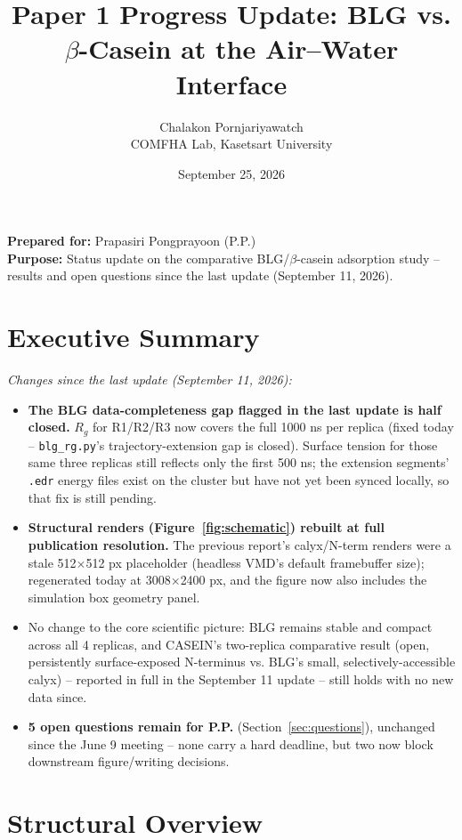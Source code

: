 \documentclass[11pt]{article}
\title{Paper 1 Progress Update: BLG vs. $\beta$-Casein at the Air--Water Interface}
\author{Chalakon Pornjariyawatch \\ COMFHA Lab, Kasetsart University}
\date{September 25, 2026}
\begin{document}
\maketitle

\noindent\textbf{Prepared for:} Prapasiri Pongprayoon (P.P.) \\
\textbf{Purpose:} Status update on the comparative BLG/$\beta$-casein adsorption study --
results and open questions since the last update (September 11, 2026).

\section*{Executive Summary}
\noindent\textit{Changes since the last update (September 11, 2026):}
\begin{itemize}[itemsep=2pt]
  \item \textbf{The BLG data-completeness gap flagged in the last update is half closed.}
    $R_g$ for R1/R2/R3 now covers the full 1000 ns per replica (fixed today --
    \texttt{blg\_rg.py}'s trajectory-extension gap is closed). Surface tension for those
    same three replicas still reflects only the first 500 ns; the extension segments'
    \texttt{.edr} energy files exist on the cluster but have not yet been synced locally,
    so that fix is still pending.
  \item \textbf{Structural renders (Figure~\ref{fig:schematic}) rebuilt at full
    publication resolution.} The previous report's calyx/N-term renders were a stale
    512$\times$512 px placeholder (headless VMD's default framebuffer size); regenerated
    today at 3008$\times$2400 px, and the figure now also includes the simulation box
    geometry panel.
  \item No change to the core scientific picture: BLG remains stable and compact across
    all 4 replicas, and CASEIN's two-replica comparative result (open, persistently
    surface-exposed N-terminus vs. BLG's small, selectively-accessible calyx) --
    reported in full in the September 11 update -- still holds with no new data since.
  \item \textbf{5 open questions remain for P.P.} (Section~\ref{sec:questions}), unchanged
    since the June 9 meeting -- none carry a hard deadline, but two now block downstream
    figure/writing decisions.
\end{itemize}

\section{Structural Overview}
\end{document}
